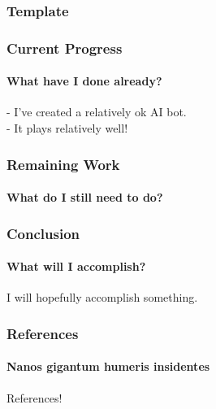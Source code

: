 \documentclass{beamer}
\begin{document}
\begin{frame}
	\frametitle{Template}
\end{frame}

\begin{frame}
	\frametitle{Current Progress}
	\framesubtitle{What have I done already?}

	- I've created a relatively ok AI bot. \\
	- It plays relatively well! \\

\end{frame}

\begin{frame}
	\frametitle{Remaining Work}
	\framesubtitle{What do I still need to do?}
\end{frame}

\begin{frame}
	\frametitle{Conclusion}
	\framesubtitle{What will I accomplish?}
	I will hopefully accomplish something.
\end{frame}

\begin{frame}
	\frametitle{References}
	\framesubtitle{Nanos gigantum humeris insidentes}
	References!
\end{frame}
\end{document}

